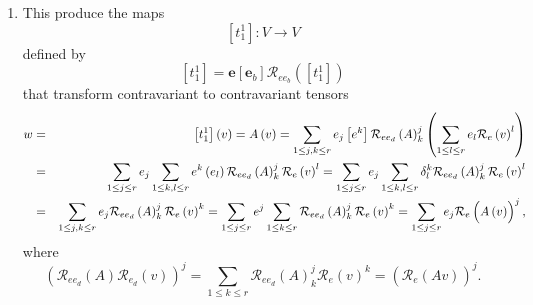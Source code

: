 \documentclass[aps,preprint]{revtex4}
\begin{document}
\begin{enumerate}
\begin{enumerate}
\item This produce the maps 
\begin{equation}
\left[ t_{1}^{1}\right] :V\rightarrow V
\end{equation}%
defined by 
\begin{equation}
\left[ t_{1}^{1}\right] =\boldsymbol{e}\left[ \boldsymbol{e}_{b}\right] 
\mathcal{R}_{ee_{b}}\left( \left[ t_{1}^{1}\right] \right)
\end{equation}%
that transform contravariant to contravariant tensors%
\begin{eqnarray}
w &=&\left[ t_{1}^{1}\right] \left( v\right) =A\left( v\right) =\sum_{1\leq
j,k\leq r}e_{j}\left[ e^{k}\right] \mathcal{R}_{ee_{d}}\left( A\right)
_{k}^{j}\left( \sum_{1\leq l\leq r}e_{l}\mathcal{R}_{e}\left( v\right)
^{l}\right) \\
&=&\sum_{1\leq j\leq r}e_{j}\sum_{1\leq k,l\leq r}e^{k}\left( e_{l}\right) 
\mathcal{R}_{ee_{d}}\left( A\right) _{k}^{j}\mathcal{R}_{e}\left( v\right)
^{l}=\sum_{1\leq j\leq r}e_{j}\sum_{1\leq k,l\leq r}\delta _{l}^{k}\mathcal{R%
}_{ee_{d}}\left( A\right) _{k}^{j}\mathcal{R}_{e}\left( v\right) ^{l} \\
&=&\sum_{1\leq j,k\leq r}e_{j}\mathcal{R}_{ee_{d}}\left( A\right) _{k}^{j}%
\mathcal{R}_{e}\left( v\right) ^{k}=\sum_{1\leq j\leq r}e^{j}\sum_{1\leq
k\leq r}\mathcal{R}_{ee_{d}}\left( A\right) _{k}^{j}\mathcal{R}_{e}\left(
v\right) ^{k}=\sum_{1\leq j\leq r}e_{j}\mathcal{R}_{e}\left( \overset{}{%
A\left( v\right) }\right) ^{j},
\end{eqnarray}%
where 
\begin{equation}
\left( \overset{}{\mathcal{R}_{ee_{d}}\left( A\right) \mathcal{R}%
_{e_{d}}\left( v\right) }\right) ^{j}=\sum_{1\leq k\leq r}\mathcal{R}%
_{ee_{d}}\left( A\right) _{k}^{j}\mathcal{R}_{e}\left( v\right) ^{k}=\left( 
\overset{}{\mathcal{R}_{e}\left( Av\right) }\right) ^{j}.
\end{equation}


\end{enumerate}
\end{enumerate}
\end{document}
